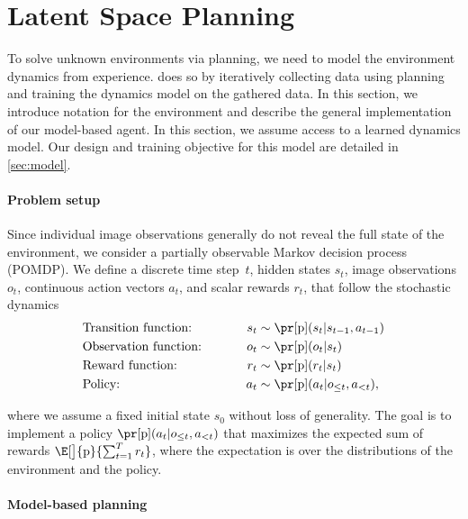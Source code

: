 \section{Latent Space Planning}
\label{sec:planning}



To solve unknown environments via planning, we need to model the environment dynamics from experience. \method does so by iteratively collecting data using planning and training the dynamics model on the gathered data. In this section, we introduce notation for the environment and describe the general implementation of our model-based agent. In this section, we assume access to a learned dynamics model. Our design and training objective for this model are detailed in \cref{sec:model}.

\paragraph{Problem setup}

Since individual image observations generally do not reveal the full state of the environment, we consider a partially observable Markov decision process (POMDP). We define a discrete time step~$t$, hidden states $s_t$, image observations $o_t$, continuous action vectors $a_t$, and scalar rewards $r_t$, that follow the stochastic dynamics
\begin{gather}
\begin{aligned}
\makebox[12em][l]{Transition function:} && s_t &\sim\pr[\mathrm{p}](s_t|s_{t-1},a_{t-1}) \\
\makebox[12em][l]{Observation function:} && o_t &\sim\pr[\mathrm{p}](o_t|s_t) \\
\makebox[12em][l]{Reward function:} && r_t &\sim\pr[\mathrm{p}](r_t|s_t) \\
\makebox[12em][l]{Policy:} && a_t &\sim\pr[\mathrm{p}](a_t|o_{\leq t},a_{<t}),
\label{eq:pomdp}
\end{aligned}
\raisetag{2.4\baselineskip}
\end{gather}%

where we assume a fixed initial state $s_0$ without loss of generality. The goal is to implement a policy $\pr[\mathrm{p}](a_t|o_{\leq t},a_{<t})$ that maximizes the expected sum of rewards  $\E[\big]{\mathrm{p}}{\sum_{t=1}^T r_t}$, where the expectation is over the distributions of the environment and the policy.

\paragraph{Model-based planning}

